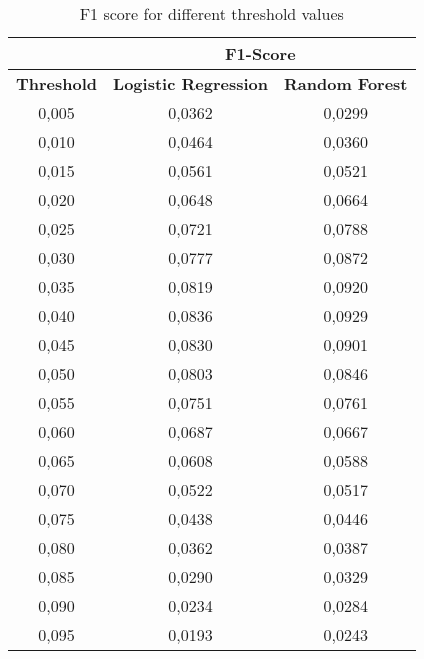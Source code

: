 \begin{table}[H]
\centering
\begin{tabular}{ccc}\toprule
								    & \multicolumn{2}{c}{\textbf{F1-Score}}                 \\\midrule
 \textbf{Threshold}                 & \textbf{Logistic Regression} & \textbf{Random Forest} \\
0,005                               & 0,0362                       & 0,0299                 \\
0,010                               & 0,0464                       & 0,0360                 \\
0,015                               & 0,0561                       & 0,0521                 \\
0,020                               & 0,0648                       & 0,0664                 \\
0,025                               & 0,0721                       & 0,0788                 \\
0,030                               & 0,0777                       & 0,0872                 \\
0,035                               & 0,0819                       & 0,0920                 \\
0,040                               & 0,0836                       & 0,0929                 \\
0,045                               & 0,0830                       & 0,0901                 \\
0,050                               & 0,0803                       & 0,0846                 \\
0,055                               & 0,0751                       & 0,0761                 \\
0,060                               & 0,0687                       & 0,0667                 \\
0,065                               & 0,0608                       & 0,0588                 \\
0,070                               & 0,0522                       & 0,0517                 \\
0,075                               & 0,0438                       & 0,0446                 \\
0,080                               & 0,0362                       & 0,0387                 \\
0,085                               & 0,0290                       & 0,0329                 \\
0,090                               & 0,0234                       & 0,0284                 \\
0,095                               & 0,0193                       & 0,0243                \\\bottomrule
\end{tabular}
\caption{F1 score for different threshold values}
\label{tab:re_f1thresh}
\end{table}

